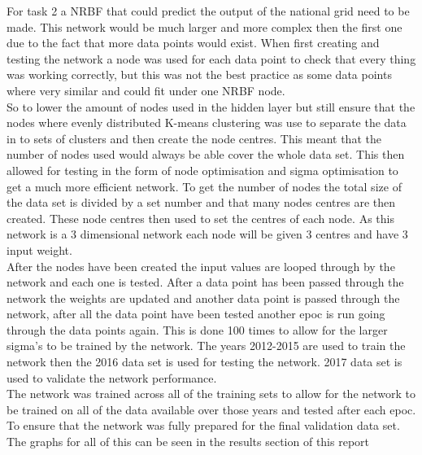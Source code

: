 \documentclass{IEEEtran}[11pt]
\begin{document}
\begin{flushleft}
  For task 2 a NRBF that could predict the output of the national grid need to
  be made. This network would be much larger and more complex then the first one
  due to the fact that more data points would exist. When first creating and
  testing the network a node was used for each data point to check that every
  thing was working correctly, but this was not the best practice as some data
  points where very similar and could fit under one NRBF node.
  \\
  \vspace{2.5mm}
  So to lower the amount of nodes used in the hidden layer but still ensure
  that the nodes where evenly distributed K-means clustering was use to separate
  the data in to sets of clusters and then create the node centres. This meant
  that the number of nodes used would always be able cover the whole data set.
  This then allowed for testing in the form of node optimisation and sigma
  optimisation to get a much more efficient network. To get the number of nodes
  the total size of the data set is divided by a set number and that many nodes
  centres are then created. These node centres then used to set the centres of
  each node. As this network is a 3 dimensional network each node will be given
  3 centres and have 3 input weight.
  \\
  \vspace{2.5mm}
  After the nodes have been created the input values are looped through by the
  network and each one is tested. After a data point has been passed through the
  network the weights are updated and another data point is passed through the
  network, after all the data point have been tested another epoc is run going
  through the data points again. This is done 100 times to allow for the larger
  sigma's to be trained by the network. The years 2012-2015 are used to train
  the network then the 2016 data set is used for testing the network. 2017 data
  set is used to validate the network performance.
  \\
  \vspace{2.5mm}
  The network was trained across all of the training sets to allow for the network to be trained on all of the data
  available over those years and tested after each epoc. To ensure that the network was fully prepared for the
  final validation data set.
  \\
  \vspace{1.5mm}
  The graphs for all of this can be seen in the results section of this report

\end{flushleft}
\end{document}
